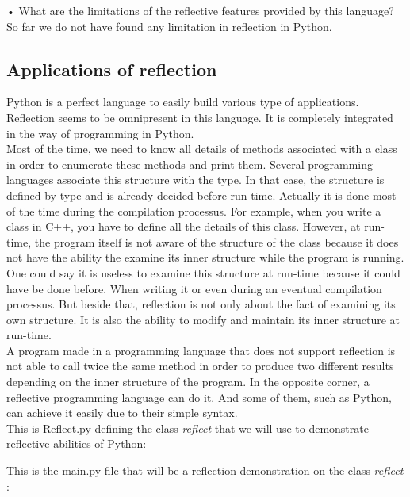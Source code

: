 •	What are the limitations of the reflective features provided by this language?\\
So far we do not have found any limitation in reflection in Python.


\subsection{Applications of reflection}

Python is a perfect language to easily build various type of applications. 
Reflection seems to be omnipresent in this language. 
It is completely integrated in the way of programming in Python.\\

Most of the time, we need to know all details of methods associated with a class in order to enumerate these methods and print them. Several programming languages associate this structure with the type. In that case, the structure is defined by type and is already decided before run-time. Actually it is done most of the time during the compilation processus. For example, when you write a class in C++, you have to define all the details of this class. However, at run-time, the program itself is not aware of the structure of the class because it does not have the ability the examine its inner structure while the program is running.\\
One could say it is useless to examine this structure at run-time because it could have be done before. When writing it or even during an eventual compilation processus. But beside that, reflection is not only about the fact of examining its own structure. It is also the ability to modify and maintain its inner structure at run-time.\\
A program made in a programming language that does not support reflection is not able to call twice the same method in order to produce two different results depending on the inner structure of the program. In the opposite corner, a reflective programming language can do it. And some of them, such as Python, can achieve it easily due to their simple syntax. \cite{assembleforce} \\


This is Reflect.py defining the class \emph{reflect} that we will use to demonstrate reflective abilities of Python:


This is the main.py file that will be a reflection demonstration on the class \emph{reflect} :


